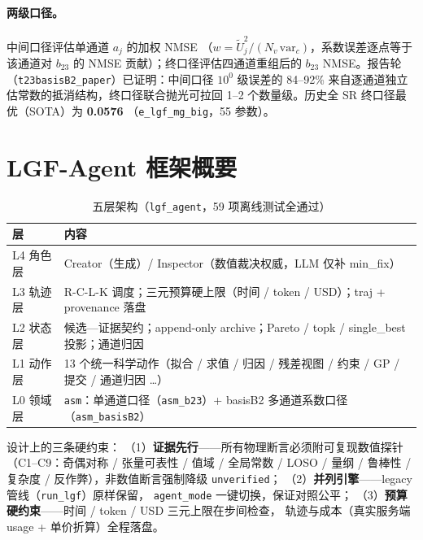\documentclass[11pt,a4paper]{ctexart}
\begin{document}
\paragraph{两级口径。}中间口径评估单通道 $a_j$ 的加权 NMSE
（$w=\tilde U_j^2/(N_v\,\mathrm{var}_c)$，系数误差逐点等于该通道对 $b_{23}$
的 NMSE 贡献）；终口径评估四通道重组后的 $b_{23}$ NMSE。报告轮
（\texttt{t23basisB2\_paper}）已证明：中间口径 $10^0$ 级误差的
84--92\% 来自逐通道独立估常数的抵消结构，终口径联合抛光可拉回
1--2 个数量级。历史全 SR 终口径最优（SOTA）为 \textbf{0.0576}
（\texttt{e\_lgf\_mg\_big}，55 参数）。

\section{LGF-Agent 框架概要}

\begin{table}[htbp]\centering\small
\caption{五层架构（\texttt{lgf\_agent}，59 项离线测试全通过）}
\begin{tabular}{@{}lp{10.2cm}@{}}
\toprule
层 & 内容 \\
\midrule
L4 角色层 & Creator（生成）/ Inspector（数值裁决权威，LLM 仅补 min\_fix） \\
L3 轨迹层 & R-C-L-K 调度；三元预算硬上限（时间 / token / USD）；traj + provenance 落盘 \\
L2 状态层 & 候选—证据契约；append-only archive；Pareto / topk / single\_best 投影；通道归因 \\
L1 动作层 & 13 个统一科学动作（拟合 / 求值 / 归因 / 残差视图 / 约束 / GP / 提交 / 通道归因 \dots） \\
L0 领域层 & \texttt{asm}：单通道口径（\texttt{asm\_b23}）+ basisB2 多通道系数口径（\texttt{asm\_basisB2}） \\
\bottomrule
\end{tabular}
\end{table}

设计上的三条硬约束：
（1）\textbf{证据先行}——所有物理断言必须附可复现数值探针
（C1--C9：奇偶对称 / 张量可表性 / 值域 / 全局常数 / LOSO / 量纲 /
鲁棒性 / 复杂度 / 反作弊），非数值断言强制降级 \texttt{unverified}；
（2）\textbf{并列引擎}——legacy 管线（\texttt{run\_lgf}）原样保留，
\texttt{agent\_mode} 一键切换，保证对照公平；
（3）\textbf{预算硬约束}——时间 / token / USD 三元上限在步间检查，
轨迹与成本（真实服务端 usage + 单价折算）全程落盘。

\end{document}
